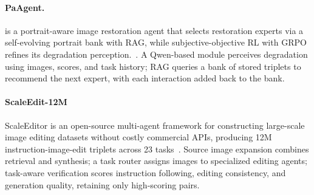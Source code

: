\paragraph{PaAgent.}
  is a portrait-aware image restoration agent that selects restoration experts via a self-evolving portrait bank with RAG, while subjective-objective RL with GRPO refines its degradation perception.~\cite{avg260317055}. A Qwen-based module perceives degradation using images, scores, and task history; RAG queries a bank of stored triplets to recommend the next expert, with each interaction added back to the bank.



\paragraph{ScaleEdit-12M}
 ScaleEditor is an open-source multi-agent framework for constructing large-scale image editing datasets without costly commercial APIs, producing 12M instruction-image-edit triplets across 23 tasks~\cite{avg260320644}. Source image expansion combines retrieval and synthesis; a task router assigns images to specialized editing agents; task-aware verification scores instruction following, editing consistency, and generation quality, retaining only high-scoring pairs. 



